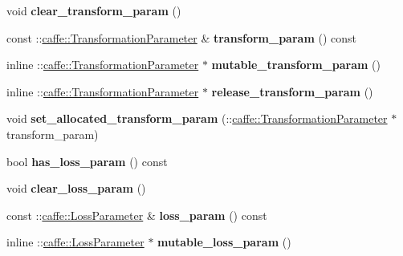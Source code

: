 \begin{DoxyCompactItemize}
void {\bfseries clear\+\_\+transform\+\_\+param} ()
\item 
\mbox{\label{classcaffe_1_1_layer_parameter_aecbc737b9d92bbdcfcc00a6a5d9c3d79}} 
const \+::\mbox{\hyperlink{classcaffe_1_1_transformation_parameter}{caffe\+::\+Transformation\+Parameter}} \& {\bfseries transform\+\_\+param} () const
\item 
\mbox{\label{classcaffe_1_1_layer_parameter_add4434eca67f21a01e6608429ee4de85}} 
inline \+::\mbox{\hyperlink{classcaffe_1_1_transformation_parameter}{caffe\+::\+Transformation\+Parameter}} $\ast$ {\bfseries mutable\+\_\+transform\+\_\+param} ()
\item 
\mbox{\label{classcaffe_1_1_layer_parameter_a7fe799626d7dd7352d47d08729f22715}} 
inline \+::\mbox{\hyperlink{classcaffe_1_1_transformation_parameter}{caffe\+::\+Transformation\+Parameter}} $\ast$ {\bfseries release\+\_\+transform\+\_\+param} ()
\item 
\mbox{\label{classcaffe_1_1_layer_parameter_ae2e0a6e639de935a350b851949bd673a}} 
void {\bfseries set\+\_\+allocated\+\_\+transform\+\_\+param} (\+::\mbox{\hyperlink{classcaffe_1_1_transformation_parameter}{caffe\+::\+Transformation\+Parameter}} $\ast$transform\+\_\+param)
\item 
\mbox{\label{classcaffe_1_1_layer_parameter_a92bc8c87be29b7bdcc3921218297c7da}} 
bool {\bfseries has\+\_\+loss\+\_\+param} () const
\item 
\mbox{\label{classcaffe_1_1_layer_parameter_a113065208714f427f0ee0957c02ce8c5}} 
void {\bfseries clear\+\_\+loss\+\_\+param} ()
\item 
\mbox{\label{classcaffe_1_1_layer_parameter_ae6532b0be1431647d487824780057dc0}} 
const \+::\mbox{\hyperlink{classcaffe_1_1_loss_parameter}{caffe\+::\+Loss\+Parameter}} \& {\bfseries loss\+\_\+param} () const
\item 
\mbox{\label{classcaffe_1_1_layer_parameter_a25f41fd0e521c3573b6e9e3e0f9b7c9b}} 
inline \+::\mbox{\hyperlink{classcaffe_1_1_loss_parameter}{caffe\+::\+Loss\+Parameter}} $\ast$ {\bfseries mutable\+\_\+loss\+\_\+param} ()

\end{DoxyCompactItemize}
